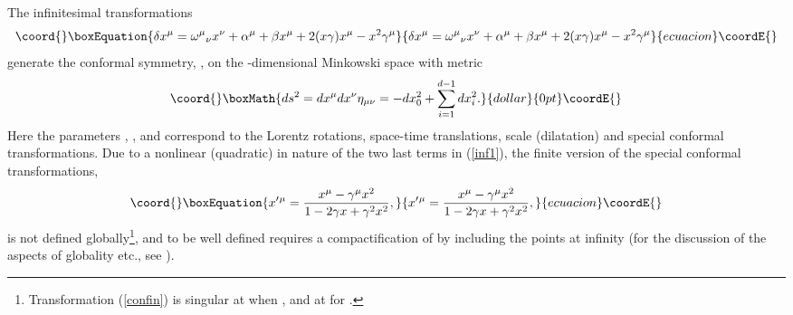 \documentclass[a4paper,12pt]{article}
\def\R{\mathbb R}
\begin{document}
The infinitesimal transformations
\begin{equation}\coord{}\boxEquation{
\delta x^\mu = \omega^\mu{}_\nu x^\nu  + \alpha^\mu + \beta
x^\mu +
2(x\gamma)x^\mu - x^2\gamma^\mu
\label{inf1}
}{
\delta x^\mu = \omega^\mu{}_\nu x^\nu  + \alpha^\mu + \beta
x^\mu +
2(x\gamma)x^\mu - x^2\gamma^\mu
}{ecuacion}\coordE{}\end{equation}
generate the conformal symmetry,
\coordHE{},
on the
\coordHE{}-dimensional Minkowski space \myHighlight{$\R^{1,d-1}$}\coordHE{}
with metric
$$\coord{}\boxMath{
ds^2=dx^\mu dx^\nu\eta_{\mu\nu}=-dx_0^2+\sum_{i=1}^{d-1}dx^{
2}_i.
}{dollar}{0pt}\coordE{}$$
Here
the parameters
\myHighlight{$\omega^\mu{}_\nu$}\coordHE{},
\myHighlight{$\alpha^\mu$}\coordHE{},
\myHighlight{$\beta$}\coordHE{}
and \myHighlight{$\gamma^\mu$}\coordHE{} correspond
to the Lorentz rotations,
space-time translations,
scale (dilatation) and special conformal transformations.
Due to a nonlinear (quadratic) in \coordHE{}
nature of the two  last terms in (\ref{inf1}),
the finite version of the special
conformal transformations,
\begin{equation}\coord{}\boxEquation{
x'{}^\mu=\frac{x^\mu-\gamma^\mu x^2}{1
-2\gamma x + \gamma^2 x^2},
\label{confin}
}{
x'{}^\mu=\frac{x^\mu-\gamma^\mu x^2}{1
-2\gamma x + \gamma^2 x^2},
}{ecuacion}\coordE{}\end{equation}
is not defined globally\footnote{
Transformation (\ref{confin}) is singular at
\coordHE{} when
\coordHE{},
and at \coordHE{}
for \coordHE{}.},
and to be well defined requires a
compactification of \myHighlight{$\R^{1,d-1}$}\coordHE{}
by including the points at infinity
(for the discussion of the aspects of globality etc.,
see \cite{HE,WitE,Ahar}).
\end{document}
